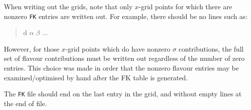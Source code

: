 \documentclass[11pt]{article}
\begin{document}
When writing out the grids, note that only $x$-grid points for which there are nonzero {\tt FK} entries are written out. For example, there should be no lines such as:
\begin{quotation} d \:\: $\alpha$ \:\: $\beta$ \: \:      \:    \:\:  ... \:  \end{quotation}
However, for those $x$-grid points which do have nonzero $\sigma$ contributions, the full set of flavour contributions must be written out regardless of the number of zero entries. This choice was made in order that the nonzero flavour entries may be examined/optimised by hand after the FK table is generated.

The {\tt FK} file should end on the last entry in the grid, and without empty lines at the end of file.
\end{document}
